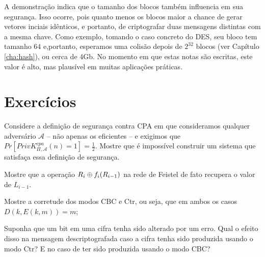 A demonstração indica que o tamanho dos blocos também influencia em sua segurança.
Isso ocorre, pois quanto menos os blocos maior a chance de gerar vetores inciais idênticos, e portanto, de criptografar duas mensagens distintas com a mesma chave.
Como exemplo, tomando o caso concreto do DES, seu bloco tem tamanho $64$ e,portanto, esperamos uma colisão depois de $2^{32}$ blocos (ver Capítulo \ref{cha:hash}), ou cerca de 4Gb.
No momento em que estas notas são escritas, este valor é alto, mas plausível em muitas aplicações práticas.

\section{Exercícios}
\label{sec:exercicios}

\begin{exercicio}
  Considere a definição de segurança contra CPA em que consideramos qualquer adversário $\mathcal{A}$ -- não apenas os eficientes -- e exigimos que $Pr[PrivK^{cpa}_{\Pi,\mathcal{A}}(n) = 1] = \frac{1}{2}$.
  Mostre que é impossível construir um sistema que satisfaça essa definição de segurança.
\end{exercicio}

\begin{exercicio}
Mostre que a operação $R_i \oplus f_i(R_{i-1})$ na rede de Feistel de fato recupera o valor de $L_{i-1}$.
\end{exercicio}

\begin{exercicio}
  Mostre a corretude dos modos CBC e Ctr, ou seja, que em ambos os casos $D(k, E(k,m)) = m$;
\end{exercicio}

\begin{exercicio}
Suponha que um bit em uma cifra tenha sido alterado por um erro.
Qual o efeito disso na mensagem descriptografada caso a cifra tenha sido produzida usando o modo Ctr? E no caso de ter sido produzida usando o modo CBC?  
\end{exercicio}



